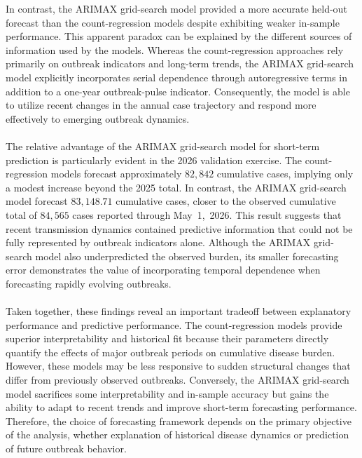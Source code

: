 \documentclass[utf8]{FrontiersinHarvard} %
\begin{document}
In contrast, the ARIMAX grid-search model provided a more accurate held-out forecast than the count-regression models despite exhibiting weaker in-sample performance. This apparent paradox can be explained by the different sources of information used by the models. Whereas the count-regression approaches rely primarily on outbreak indicators and long-term trends, the ARIMAX grid-search model explicitly incorporates serial dependence through autoregressive terms in addition to a one-year outbreak-pulse indicator. Consequently, the model is able to utilize recent changes in the annual case trajectory and respond more effectively to emerging outbreak dynamics.
\\~~\\
The relative advantage of the ARIMAX grid-search model for short-term prediction is particularly evident in the 2026 validation exercise. The count-regression models forecast approximately \(82,842\) cumulative cases, implying only a modest increase beyond the 2025 total. In contrast, the ARIMAX grid-search model forecast \(83,148.71\) cumulative cases, closer to the observed cumulative total of \(84,565\) cases reported through May~1,~2026. This result suggests that recent transmission dynamics contained predictive information that could not be fully represented by outbreak indicators alone. Although the ARIMAX grid-search model also underpredicted the observed burden, its smaller forecasting error demonstrates the value of incorporating temporal dependence when forecasting rapidly evolving outbreaks.
\\~~\\
Taken together, these findings reveal an important tradeoff between explanatory performance and predictive performance. The count-regression models provide superior interpretability and historical fit because their parameters directly quantify the effects of major outbreak periods on cumulative disease burden. However, these models may be less responsive to sudden structural changes that differ from previously observed outbreaks. Conversely, the ARIMAX grid-search model sacrifices some interpretability and in-sample accuracy but gains the ability to adapt to recent trends and improve short-term forecasting performance. Therefore, the choice of forecasting framework depends on the primary objective of the analysis, whether explanation of historical disease dynamics or prediction of future outbreak behavior.
\end{document}
